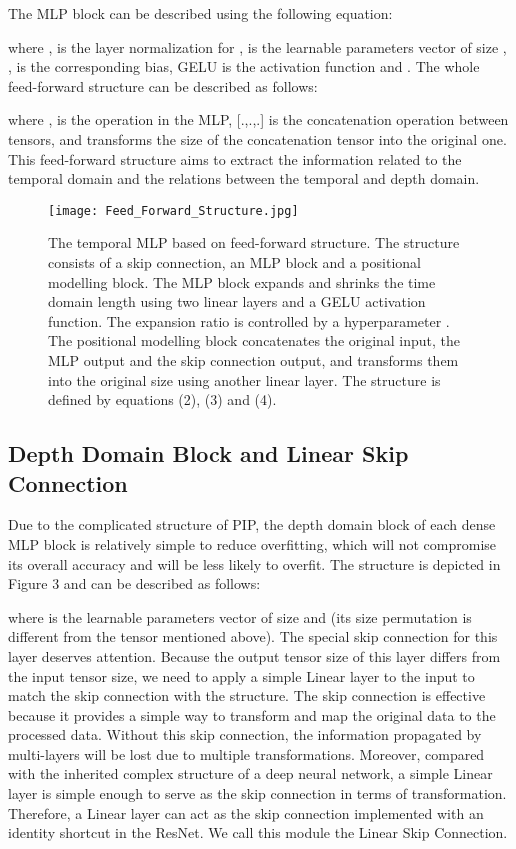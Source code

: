 \documentclass[runningheads]{llncs}
\begin{document}
 The MLP block can be described using the following equation:

where  ,   is the layer normalization for  ,  is the learnable parameters vector of size , ,  is the corresponding bias, GELU is the activation function and .
The whole feed-forward structure can be described as follows:

where , is the operation in the MLP, [.,.,.] is the concatenation operation between tensors, and  transforms the size of the concatenation tensor into the original one. This feed-forward structure aims to extract the information related to the temporal domain and the relations between the temporal and depth domain.

\begin{figure}
\centering
\texttt{[image: Feed\_Forward\_Structure.jpg]}
\caption{The temporal MLP based on feed-forward structure. The structure consists of a skip connection, an MLP block and a positional modelling block. The MLP block expands and shrinks the time domain length using two linear layers and a GELU activation function. The expansion ratio is controlled by a hyperparameter . The positional modelling block concatenates the original input, the MLP output and the skip connection output, and transforms them into the original size using another linear layer. The structure is defined by equations (2), (3) and (4). } \label{fig2}
\end{figure}


\subsection{Depth Domain Block and Linear Skip Connection}
Due to the complicated structure of PIP, the depth domain block of each dense MLP block is relatively simple to reduce overfitting, which will not compromise its overall accuracy and will be less likely to overfit. The structure is depicted in Figure 3 and can be described as follows:

where  is the learnable parameters vector of size  and   (its size permutation is different from the tensor  mentioned above). The special skip connection for this layer deserves attention. Because the output tensor size of this layer differs from the input tensor size, we need to apply a simple Linear layer to the input to match the skip connection with the structure. The skip connection is effective because it provides a simple way to transform and map the original data to the processed data. Without this skip connection, the information propagated by multi-layers will be lost due to multiple transformations.
Moreover, compared with the inherited complex structure of a deep neural network, a simple Linear layer is simple enough to serve as the skip connection in terms of transformation. Therefore, a Linear layer can act as the skip connection implemented with an identity shortcut in the ResNet. We call this module the Linear Skip Connection.
\end{document}
